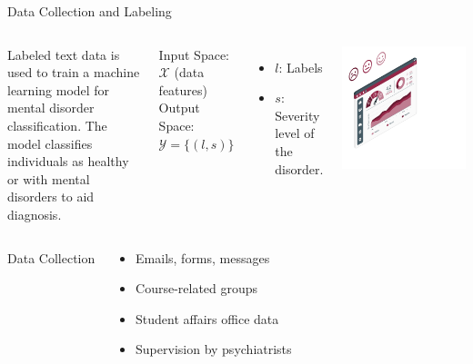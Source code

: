 \documentclass[10pt, xcolor=table]{beamer}
\let\olditem\item
\renewcommand\item{\olditem\justifying}
\begin{document}
	\begin{frame}{Data Collection and Labeling}
		\vspace{-0.5cm}
		\begin{columns}[c]
			\justifying
			
			Labeled text data is used to train a machine learning model for mental disorder classification. The model classifies individuals as healthy or with mental disorders to aid diagnosis.
			
			\centering
			Input Space: \( \mathcal{X} \) (data features) \\
			Output Space: \( \mathcal{Y} = \{(l, s)\} \) \\
			\begin{itemize}
				\item \( l \): Labels
				\item \( s \): Severity level of the disorder.
			\end{itemize}
			
			\centering

			\includegraphics[width=0.8\linewidth]{./figures/sentimental_analysis.png} %
		\end{columns}
		\vspace{0.1cm}
		\begin{columns}[c]
			\centering
			Data Collection \\
			\begin{tcolorbox}[width=\linewidth, colback=myNewColorB, colframe=myNewColorA, boxrule=0.7mm, rounded corners]
				\justifying
				\begin{itemize}
					\item Emails, forms, messages
					\item Course-related groups
					\item Student affairs office data
					\item Supervision by psychiatrists
				\end{itemize}
			\end{tcolorbox}
			

\end{columns}
\end{frame}
\end{document}
